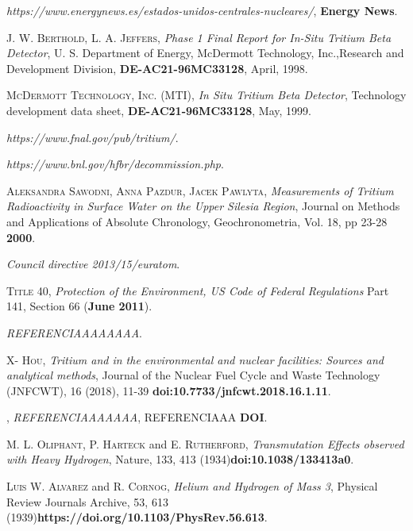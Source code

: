\begin{thebibliography}{100}
\textit{https://www.energynews.es/estados-unidos-centrales-nucleares/}, 
\textbf{Energy News}.

 \textsc{J. W. Berthold}, \textsc{L. A. Jeffers},
\textit{Phase 1 Final Report for In-Situ Tritium Beta Detector}, 
U. S. Department of Energy, McDermott Technology, Inc.,Research and Development Division, 	\textbf{DE-AC21-96MC33128}, April, 1998.

 \textsc{McDermott Technology, Inc. (MTI)}, 
\textit{In Situ Tritium Beta Detector}, 
Technology development data sheet, \textbf{DE-AC21-96MC33128}, May, 1999.

\textit{https://www.fnal.gov/pub/tritium/}.

\textit{https://www.bnl.gov/hfbr/decommission.php}.

 \textsc{Aleksandra Sawodni}, \textsc{Anna Pazdur}, \textsc{Jacek Pawlyta}, 
\textit{Measurements of Tritium Radioactivity in Surface Water on the Upper Silesia Region}, Journal on Methods and Applications of Absolute Chronology, Geochronometria, Vol. 18, pp 23-28 \textbf{2000}.

\textit{Council directive 2013/15/euratom}.

 \textsc{Title 40},  
\textit{Protection of the Environment, US Code of Federal Regulations} Part 141, Section 66 (\textbf{June 2011}).

\textit{REFERENCIAAAAAAAA}.

 \textsc{X- Hou},  
\textit{Tritium and  in the environmental and nuclear facilities: Sources and analytical methods}, Journal of the Nuclear Fuel Cycle and Waste Technology (JNFCWT), 16 (2018), 11-39 \textbf{doi:10.7733/jnfcwt.2018.16.1.11}.

 \textsc{},  
\textit{REFERENCIAAAAAAA}, REFERENCIAAA \textbf{DOI}.

 \textsc{M. L. Oliphant}, \textsc{P. Harteck} and \textsc{E. Rutherford},  
\textit{Transmutation Effects observed with Heavy Hydrogen}, Nature, 133, 413 (1934)\textbf{doi:10.1038/133413a0}.

 \textsc{Luis W. Alvarez} and \textsc{R. Cornog},  
\textit{Helium and Hydrogen of Mass 3}, Physical Review Journals Archive, 53, 613 (1939)\textbf{https://doi.org/10.1103/PhysRev.56.613}.


\end{thebibliography}
